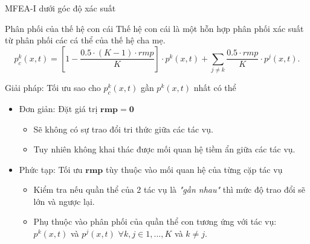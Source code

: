 	\begin{frame}{MFEA-I dưới góc độ xác suất}
		\begin{itemize}
	    	\begin{block}{Phân phối của thế hệ con cái}
                Thế hệ con cái là một hỗn hợp phân phối xác suất từ phân phối các cá thể của thế hệ cha mẹ.
                \begin{equation}
                p_c^k(x,t) = [1 - \frac{0.5 \cdot (K - 1) \cdot rmp}{K} ] \cdot p^k(x,t) + \sum_{j \neq k}\frac{0.5 \cdot rmp}{K} \cdot p^j(x,t). 
                \label{equa:mfea_offstring_distribution}
                \end{equation}
			\end{block}
			\begin{block}{Giải pháp: Tối ưu sao cho $p_c^k(x,t)$ gần $p^k(x,t)$ nhất có thể}
                \begin{itemize}
                    \setlength\itemsep{0.03em}
                    \item Đơn giản: Đặt giá trị $\mathbf{rmp=0}$
                        \begin{itemize}
                            \item Sẽ không có sự trao đổi tri thức giữa các tác vụ.
                            \item Tuy nhiên không khai thác được mối quan hệ tiềm ẩn giữa các tác vụ. 
                        \end{itemize}
                    \item Phức tạp: Tối ưu $\mathbf{rmp}$ tùy thuộc vào mối quan hệ của từng cặp tác vụ
                        \begin{itemize}
                        \setlength\itemsep{0.03em}
                            \item Kiểm tra nếu quần thể của 2 tác vụ là \emph{"gần nhau"} thì mức độ trao đổi sẽ lớn và ngược lại.
                            \item Phụ thuộc vào phân phối của quần thể con tương ứng với tác vụ: $p^k(x,t)$ và $p^j(x,t)$ $\forall k,j \in {1,...,K}$ và $k \neq j$.
                        \end{itemize}
                \end{itemize}
			\end{block}
		\end{itemize}
	\end{frame}
